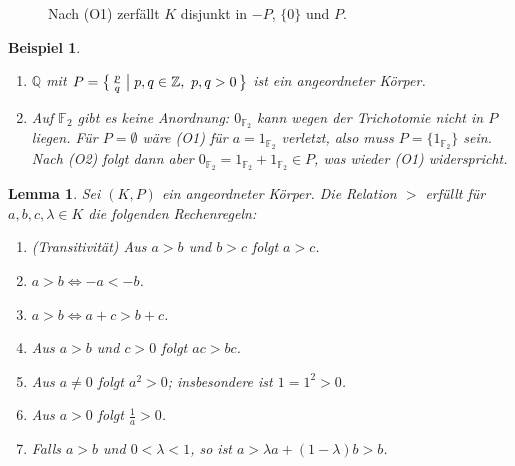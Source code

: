 \documentclass[a4paper]{article}
\theoremstyle{kurzskript}
\newtheorem{lemma}[satz]{Lemma}
\newtheorem*{bsp}{Beispiel}
\newcommand{\Z}{\mathbb{Z}}
\newcommand{\Q}{\mathbb{Q}}
\begin{document}
\begin{figure}[H]
\centering
{}
\caption{Nach (O1) zerfällt $K$ disjunkt in $-P$, $\{0\}$ und $P$.}
\end{figure}

\begin{bsp}
\leavevmode
\begin{enumerate}[label=(\arabic*)]
  \item $\Q$ mit $P = \bigl\{\, \frac{p}{q} \bigm| p, q \in \Z,\ p, q > 0 \,\bigr\}$ ist ein angeordneter Körper.
  \item Auf $\mathbb{F}_2$ gibt es keine Anordnung: $0_{\mathbb{F}_2}$ kann wegen der Trichotomie nicht in $P$ liegen. Für $P = \emptyset$ wäre (O1) für $a = 1_{\mathbb{F}_2}$ verletzt, also muss $P = \{1_{\mathbb{F}_2}\}$ sein. Nach (O2) folgt dann aber $0_{\mathbb{F}_2} = 1_{\mathbb{F}_2} + 1_{\mathbb{F}_2} \in P$, was wieder (O1) widerspricht.
\end{enumerate}
\end{bsp}

\begin{lemma}\label{lem:ordnung}
Sei $(K, P)$ ein angeordneter Körper. Die Relation $>$ erfüllt für $a, b, c, \lambda \in K$ die folgenden Rechenregeln:
\begin{enumerate}[label=(\arabic*)]
  \item (\emph{Transitivität}) Aus $a > b$ und $b > c$ folgt $a > c$.
  \item $a > b \iff -a < -b$.
  \item $a > b \iff a + c > b + c$.
  \item Aus $a > b$ und $c > 0$ folgt $ac > bc$.
  \item Aus $a \neq 0$ folgt $a^2 > 0$; insbesondere ist $1 = 1^2 > 0$.
  \item Aus $a > 0$ folgt $\frac{1}{a} > 0$.
  \item Falls $a > b$ und $0 < \lambda < 1$, so ist $a > \lambda a + (1 - \lambda) b > b$.
\end{enumerate}
\end{lemma}
\end{document}

